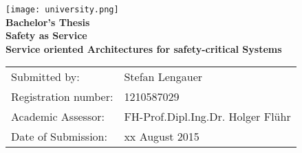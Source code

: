 \begin{titlepage}
	\begin{center}

		\texttt{[image: university.png]}\\
		\vspace*{5cm}
		\LARGE
		\textbf{Bachelor's Thesis}\\
		\vspace{1.5cm}
		\Huge
		\textbf{Safety as Service}\\
		\LARGE
		\textbf{Service oriented Architectures for safety-critical Systems}

		\vfill

		\large
		\begin{tabular}{ll}
			Submitted by:&Stefan Lengauer\\
			Registration number:&1210587029\\
			Academic Assessor:&FH-Prof.Dipl.Ing.Dr. Holger Flühr\\
			Date of Submission:&xx August 2015\\
		\end{tabular}
	\end{center}
\end{titlepage}